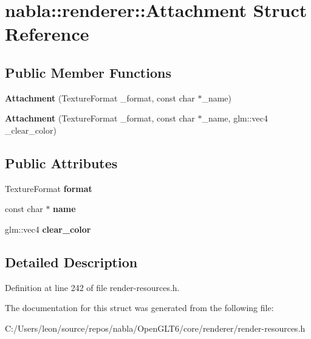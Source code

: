 \hypertarget{structnabla_1_1renderer_1_1_attachment}{}\section{nabla\+::renderer\+::Attachment Struct Reference}
\label{structnabla_1_1renderer_1_1_attachment}
\subsection*{Public Member Functions}
\begin{DoxyCompactItemize}
\item 
\mbox{\label{structnabla_1_1renderer_1_1_attachment_a4de4994404db5e743ddc68512fe58329}} 
{\bfseries Attachment} (Texture\+Format \+\_\+format, const char $\ast$\+\_\+name)
\item 
\mbox{\label{structnabla_1_1renderer_1_1_attachment_a5477bc5993ba3168f315820db8b16bc8}} 
{\bfseries Attachment} (Texture\+Format \+\_\+format, const char $\ast$\+\_\+name, glm\+::vec4 \+\_\+clear\+\_\+color)
\end{DoxyCompactItemize}
\subsection*{Public Attributes}
\begin{DoxyCompactItemize}
\item 
\mbox{\label{structnabla_1_1renderer_1_1_attachment_a6aa1c4c924524a8a098a584b2d723b4f}} 
Texture\+Format {\bfseries format}
\item 
\mbox{\label{structnabla_1_1renderer_1_1_attachment_a3b8371aecb49018764d8ef164f0b7c7f}} 
const char $\ast$ {\bfseries name}
\item 
\mbox{\label{structnabla_1_1renderer_1_1_attachment_a1098b441b76f90660df2fcd3f8d2a125}} 
glm\+::vec4 {\bfseries clear\+\_\+color}
\end{DoxyCompactItemize}


\subsection{Detailed Description}


Definition at line 242 of file render-\/resources.\+h.



The documentation for this struct was generated from the following file\+:\begin{DoxyCompactItemize}
\item 
C\+:/\+Users/leon/source/repos/nabla/\+Open\+G\+L\+T6/core/renderer/render-\/resources.\+h\end{DoxyCompactItemize}
